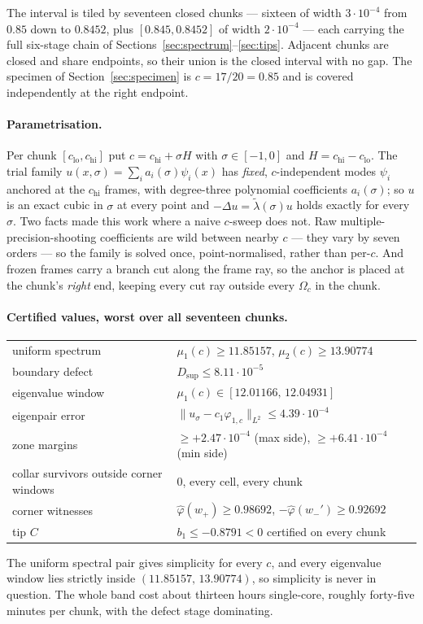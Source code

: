 \documentclass[11pt]{article}
\newcommand{\norm}[1]{\lVert #1 \rVert}
\begin{document}
The interval is tiled by seventeen closed chunks --- sixteen of width
$3\cdot10^{-4}$ from $0.85$ down to $0.8452$, plus $[0.845,0.8452]$ of
width $2\cdot10^{-4}$ --- each carrying the full six-stage chain of
Sections~\ref{sec:spectrum}--\ref{sec:tips}. Adjacent chunks are closed
and share endpoints, so their union is the closed interval with no gap.
The specimen of Section~\ref{sec:specimen} is $c=17/20=0.85$ and is
covered independently at the right endpoint.

\paragraph{Parametrisation.} Per chunk $[c_{\mathrm{lo}},c_{\mathrm{hi}}]$
put $c=c_{\mathrm{hi}}+\sigma H$ with $\sigma\in[-1,0]$ and
$H=c_{\mathrm{hi}}-c_{\mathrm{lo}}$. The trial family
$u(x,\sigma)=\sum_i a_i(\sigma)\psi_i(x)$ has \emph{fixed},
$c$-independent modes $\psi_i$ anchored at the $c_{\mathrm{hi}}$ frames,
with degree-three polynomial coefficients $a_i(\sigma)$; so $u$ is an
exact cubic in $\sigma$ at every point and $-\Delta u=\tilde\lambda
(\sigma)u$ holds exactly for every $\sigma$. Two facts made this work
where a naive $c$-sweep does not. Raw multiple-precision-shooting
coefficients are wild between nearby $c$ --- they vary by seven orders
--- so the family is solved once, point-normalised, rather than
per-$c$. And frozen frames carry a branch cut along the frame ray, so
the anchor is placed at the chunk's \emph{right} end, keeping every cut
ray outside every $\Omega_c$ in the chunk.

\paragraph{Certified values, worst over all seventeen chunks.}
\begin{center}
\begin{tabular}{ll}
\toprule
uniform spectrum & $\mu_1(c)\ge 11.85157$, $\mu_2(c)\ge 13.90774$ \\
boundary defect & $D_{\sup}\le 8.11\cdot10^{-5}$ \\
eigenvalue window & $\mu_1(c)\in[12.01166,\,12.04931]$ \\
eigenpair error & $\norm{u_\sigma-c_1\varphi_{1,c}}_{L^2}\le
4.39\cdot10^{-4}$ \\
zone margins & $\ge +2.47\cdot10^{-4}$ (max side),
$\ge +6.41\cdot10^{-4}$ (min side) \\
collar survivors outside corner windows & $0$, every cell, every chunk \\
corner witnesses & $\hat\varphi(w_+)\ge 0.98692$,
$-\hat\varphi(w_-')\ge 0.92692$ \\
tip $C$ & $b_1\le -0.8791<0$ certified on every chunk \\
\bottomrule
\end{tabular}
\end{center}
The uniform spectral pair gives simplicity for every $c$, and every
eigenvalue window lies strictly inside $(11.85157,\,13.90774)$, so
simplicity is never in question. The whole band cost about thirteen
hours single-core, roughly forty-five minutes per chunk, with the defect
stage dominating.
\end{document}
